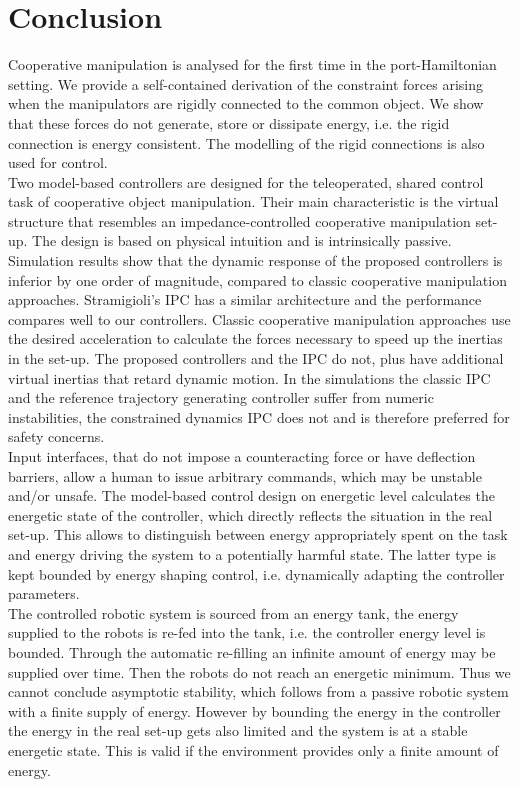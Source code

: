 \documentclass[a4paper,twoside, openright,12pt]{report}
\begin{document}
{\chapter{Conclusion}
Cooperative manipulation is analysed for the first time in the port-Hamiltonian setting. We provide a self-contained derivation of the constraint forces arising when the manipulators are rigidly connected to the common object. We show that these forces do not generate, store or dissipate energy, i.e. the rigid connection is energy consistent. The modelling of the rigid connections is also used for control.\\
Two model-based controllers are designed for the teleoperated, shared control task of cooperative object manipulation. Their main characteristic is the virtual structure that resembles an impedance-controlled cooperative manipulation set-up. The design is based on physical intuition and is intrinsically passive.\\ Simulation results show that the dynamic response of the proposed controllers is inferior by one order of magnitude, compared to classic cooperative manipulation approaches. Stramigioli's IPC has a similar architecture and the performance compares well to our controllers.
Classic cooperative manipulation approaches use the desired acceleration to calculate the forces necessary to speed up the inertias in the set-up. The proposed controllers and the IPC do not, plus have additional virtual inertias that retard dynamic motion.
In the simulations the classic IPC and the reference trajectory generating controller suffer from numeric instabilities, the constrained dynamics IPC does not and is therefore preferred for safety concerns.\\      
Input interfaces, that do not impose a counteracting force or have deflection barriers, allow a human to issue arbitrary commands, which may be unstable and/or unsafe. The model-based control design on energetic level calculates the energetic state of the controller, which directly reflects the situation in the real set-up. This allows to distinguish between energy appropriately spent on the task and energy driving the system to a potentially harmful state. The latter type is kept bounded by energy shaping control, i.e. dynamically adapting the controller parameters.\\
The controlled robotic system is sourced from an energy tank, the energy supplied to the robots is re-fed into the tank, i.e. the controller energy level is bounded. Through the automatic re-filling an infinite amount of energy may be supplied over time. Then the robots do not reach an energetic minimum. Thus we cannot conclude asymptotic stability, which follows from a passive robotic system with a finite supply of energy. However by bounding the energy in the controller the energy in the real set-up gets also limited and the system is at a stable energetic state. This is valid if the environment provides only a finite amount of energy.\\
}
\end{document}
